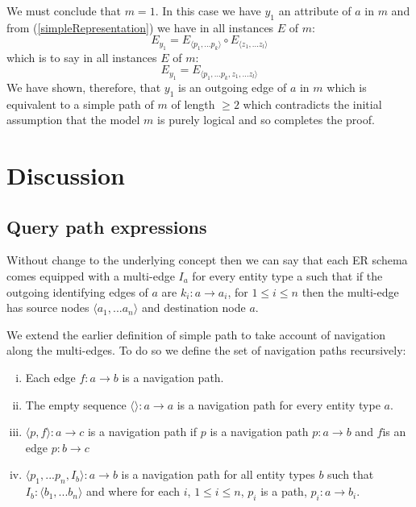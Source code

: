 \documentclass[10pt,a4paper]{article}
\newcommand{\genericmodel}{\mathcal{M}}
\renewcommand{\genericmodel}{{m}}
\begin{document}
We must conclude that $m=1$.
In this case we have $y_1$ an attribute of $a$ in $\genericmodel$ and from (\ref{simpleRepresentation})  we have in all instances $E$ of $\genericmodel$:
\begin{equation}
E_{y_1}=E_{\langle p_1,...p_k \rangle} \circ E_{\langle z_1,...z_l \rangle}
\end{equation}
\noindent which is to say in all instances $E$ of $\genericmodel$:
\begin{equation}
E_{y_1}=E_{\langle p_1,...p_k ,z_1,...z_l \rangle}
\end{equation}
\noindent
We have shown, therefore, that $y_1$ is an outgoing edge of $a$ in $\genericmodel$ 
which is equivalent to a simple path of $\genericmodel$ of length $\geq 2$ which contradicts  the 
 initial assumption that the model $\genericmodel$ is purely logical and so completes the proof.


\section{Discussion}

\subsection{Query path expressions}
\noindent Without change to the underlying concept then we can say that each ER schema comes equipped with a multi-edge $I_a$ for every entity type a such that if 
the outgoing identifying edges of $a$ are $k_i: a \rightarrow a_i$, for $1 \leq i \leq n$  then the multi-edge has source nodes $\langle a_1,...a_n\rangle$ and destination node $a$.  

\noindent We extend the earlier  definition of simple path to take account of navigation along the multi-edges. To do so we define the set of navigation paths recursively:

\begin{enumerate} [(i)]
\item{ Each edge $f: a \rightarrow b$ is a navigation path.
}
\item{ The empty sequence  $\langle \rangle : a \rightarrow a$ is a navigation path for every entity type $a$.
}
\item{ $\langle p,f \rangle : a \rightarrow c$ is a navigation path  if $p$ is a navigation path $p: a \rightarrow b$ and $f $is an edge $p: b \rightarrow c$
}
\item{ $\langle p_1,...p_n,I_b\rangle : a \rightarrow b$ is a navigation path for all entity types $b$ such that $I_b: \langle b_1,...b_n\rangle$ and where
for each $i$, $1 \leq i \leq n$, $p_i$ is a path, $p_i: a \rightarrow b_i$.   
}
\end{enumerate}
\end{document}
